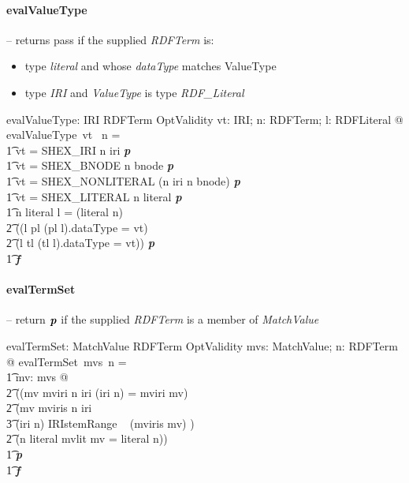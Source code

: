 \documentclass[fuzz]{llncs}
\def\pass{\textbf{\textit{p}}}
\def\fail{\textbf{\textit{f}}}
\def\zc{\textit}
\begin{document}
\paragraph{evalValueType} -- returns pass if the supplied \zc{RDFTerm} is:
\begin{itemize}
\item type \zc{literal} and whose \zc{dataType} matches ValueType
\item type \zc{IRI} and \zc{ValueType} is type \zc{RDF\_Literal}
\end{itemize}
\begin{axdef}
   evalValueType: IRI \pfun RDFTerm \pfun OptValidity
\where
   \forall vt: IRI; n: RDFTerm; l: RDFLiteral @ evalValueType~vt~ n = \\
\t1 \IF vt = SHEX\_IRI \land  n \in \ran iri \THEN \pass \\
\t1 \ELSE \IF vt = SHEX\_BNODE \land  n \in \ran bnode \THEN \pass \\
\t1 \ELSE \IF vt = SHEX\_NONLITERAL \land  (n \in \ran iri \lor n \in \ran bnode) \THEN \pass \\
\t1 \ELSE \IF vt = SHEX\_LITERAL \land  n \in \ran literal \THEN \pass \\
\t1 \ELSE \IF n \in \ran literal \land l = (literal \inv n) \land \\
\t2 ((l \in \ran pl \land (pl \inv l).dataType = vt) \lor \\
\t2  (l \in \ran tl \land (tl \inv l).dataType = vt)) \THEN \pass \\
\t1 \ELSE \fail
\end{axdef}

\paragraph{evalTermSet} -- return $\pass$ if the supplied \zc{RDFTerm} is a member of \zc{MatchValue}
\begin{axdef}
   evalTermSet: \power MatchValue \pfun RDFTerm \pfun OptValidity
\where
   \forall mvs: \power MatchValue; n: RDFTerm @ evalTermSet~mvs~n = \\
\t1	\IF \exists mv: mvs @ \\
\t2 ((mv \in \ran mviri \land n \in \ran iri \land (iri \inv n) = mviri \inv mv) \lor \\
\t2  (mv \in \ran mviris \land n \in \ran iri \land  \\
\t3 (iri \inv n) \in IRIstemRange ~ (mviris \inv mv) ) \lor \\
\t2  (n \in \ran literal \land mvlit \inv mv = literal \inv n)) \\
\t1 \THEN \pass \\
\t1 \ELSE \fail
\end{axdef}
\end{document}

